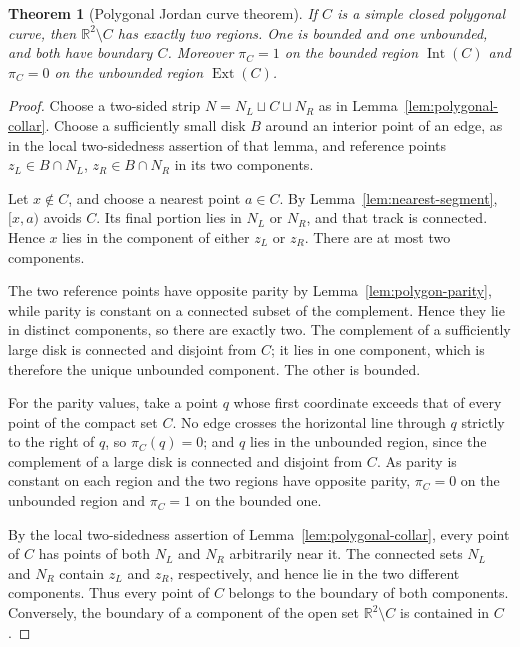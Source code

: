 \documentclass[11pt]{article}
\theoremstyle{mainplain}
\newtheorem{theorem}{Theorem}[section]
\theoremstyle{mainroman}
\theoremstyle{definition}
\numberwithin{equation}{section}
\begin{document}
\begin{theorem}[Polygonal Jordan curve theorem]\label{thm:polygonal-jordan}
If $C$ is a simple closed polygonal curve, then
$\mathbb R^2\setminus C$ has exactly two regions. One is bounded and
one unbounded, and both have boundary $C$. Moreover $\pi_C=1$ on the
bounded region $\operatorname{Int}(C)$ and $\pi_C=0$ on the unbounded
region $\operatorname{Ext}(C)$.
\end{theorem}
\begin{proof}
Choose a two-sided strip $N=N_L\sqcup C\sqcup N_R$ as in
Lemma~\ref{lem:polygonal-collar}. Choose a sufficiently small disk
$B$ around an interior point of an edge, as in the local
two-sidedness assertion of that lemma, and reference points
$z_L\in B\cap N_L$, $z_R\in B\cap N_R$ in its two components.

Let $x\notin C$, and choose a nearest point $a\in C$. By
Lemma~\ref{lem:nearest-segment}, $[x,a)$ avoids $C$. Its final portion lies
in $N_L$ or $N_R$, and that track is connected. Hence $x$ lies in the
component of either $z_L$ or $z_R$. There are at most two components.

The two reference points have opposite parity by
Lemma~\ref{lem:polygon-parity}, while parity is constant on a connected
subset of the complement. Hence they lie in distinct components, so
there are exactly two. The complement of a sufficiently large disk is
connected and disjoint from $C$; it lies in one component, which is
therefore the unique unbounded component. The other is bounded.

For the parity values, take a point $q$ whose first coordinate exceeds
that of every point of the compact set $C$. No edge crosses the
horizontal line through $q$ strictly to the right of $q$, so
$\pi_C(q)=0$; and $q$ lies in the unbounded region, since the
complement of a large disk is connected and disjoint from $C$. As
parity is constant on each region and the two regions have opposite
parity, $\pi_C=0$ on the unbounded region and $\pi_C=1$ on the bounded
one.

By the local two-sidedness assertion of
Lemma~\ref{lem:polygonal-collar}, every point of $C$ has points of
both $N_L$ and $N_R$ arbitrarily near it. The connected sets $N_L$ and
$N_R$ contain $z_L$ and $z_R$, respectively, and hence lie in the two
different components. Thus every point of $C$ belongs to the boundary
of both components. Conversely, the boundary of a component of the
open set $\mathbb R^2\setminus C$ is contained in $C$.
\end{proof}
\end{document}
